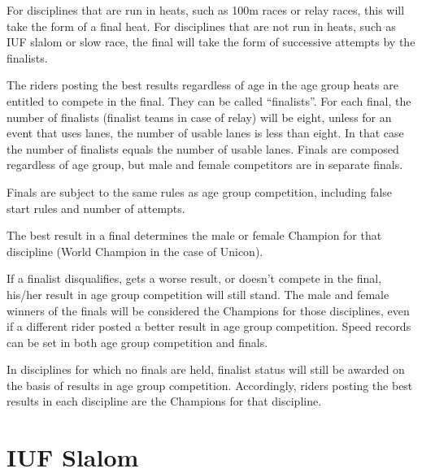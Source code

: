 For disciplines that are run in heats, such as 100m races or relay races, this will take the form of a final heat.
For disciplines that are not run in heats, such as IUF slalom or slow race, the final will take the form of successive attempts by the finalists.

The riders posting the best results regardless of age in the age group heats are entitled to compete in the final.
They can be called ``finalists''.
For each final, the number of finalists (finalist teams in case of relay) will be eight, unless for an event that uses lanes, the number of usable lanes is less than eight.
In that case the number of finalists equals the number of usable lanes.
Finals are composed regardless of age group, but male and female competitors are in separate finals.

Finals are subject to the same rules as age group competition, including false start rules and number of attempts.

The best result in a final determines the male or female Champion for that discipline (World Champion in the case of Unicon).

If a finalist disqualifies, gets a worse result, or doesn't compete in the final, his/her result in age group competition will still stand.
The male and female winners of the finals will be considered the Champions for those disciplines, even if a different rider posted a better result in age group competition.
Speed records can be set in both age group competition and finals.

In disciplines for which no finals are held, finalist status will still be awarded on the basis of results in age group competition.
Accordingly, riders posting the best results in each discipline are the Champions for that discipline.

\section{IUF Slalom}

